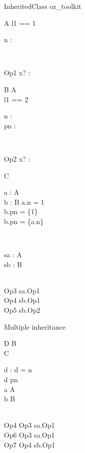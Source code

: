 \begin{zsection}
  \SECTION InheritedClass \parents oz\_toolkit
\end{zsection}

\begin{class}{A}  
  l1 == 1\\
  \begin{state}
    n : \nat
  \end{state}\\
  \begin{op}{Op1}
    x? : \nat
  \end{op}
\end{class}

\begin{class}{B}
  A\\
  l1 == 2\\
  \begin{state}
    n : \nat\\
    pn : \power \nat
  \end{state}\\
  \begin{op}{Op2}
    x? : \power \nat
  \end{op}
\end{class}

\begin{class}{C}
  \begin{axdef}
    a : A\\
    b : B
  \where
    a.n = 1\\
    b.pn = \{1\}\\
    b.pn = \{a.n\}
  \end{axdef}\\
  \begin{state}
    sa : A\\
    sb : B
  \end{state}\\
  Op3 \sdef sa.Op1\\
  Op4 \sdef sb.Op1\\
  Op5 \sdef sb.Op2
\end{class}

Multiple inheritance
\begin{class}{D}
  B\\
  C\\
  \begin{state}
    d : \nat
  \where
    d = n\\
    d \in pn\\
    a \in A\\
    b \in B
  \end{state}\\
  Op4 \sdef Op3 \land sa.Op1\\
  Op6 \sdef Op3 \land sa.Op1\\
  Op7 \sdef Op4 \land sb.Op1
\end{class}

